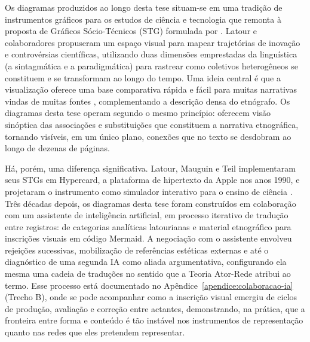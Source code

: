 Os diagramas produzidos ao longo desta tese situam-se em uma tradição de instrumentos gráficos para os estudos de ciência e tecnologia que remonta à proposta de Gráficos Sócio-Técnicos (STG) formulada por \textcite{Latour1992Note}. Latour e colaboradores propuseram um espaço visual para mapear trajetórias de inovação e controvérsias científicas, utilizando duas dimensões emprestadas da linguística (a sintagmática e a paradigmática) para rastrear como coletivos heterogêneos se constituem e se transformam ao longo do tempo. Uma ideia central é que a visualização oferece uma base comparativa rápida e fácil para muitas narrativas vindas de muitas fontes \parencite[p.~37]{LatourMauguinTeil1992}, complementando a descrição densa do etnógrafo. Os diagramas desta tese operam segundo o mesmo princípio: oferecem visão sinóptica das associações e substituições que constituem a narrativa etnográfica, tornando visíveis, em um único plano, conexões que no texto se desdobram ao longo de dezenas de páginas.

Há, porém, uma diferença significativa. Latour, Mauguin e Teil implementaram seus STGs em Hypercard, a plataforma de hipertexto da Apple nos anos 1990, e projetaram o instrumento como simulador interativo para o ensino de ciência \parencite[p.~51]{LatourMauguinTeil1992}. Três décadas depois, os diagramas desta tese foram construídos em colaboração com um assistente de inteligência artificial, em processo iterativo de tradução entre registros: de categorias analíticas latourianas e material etnográfico para inscrições visuais em código Mermaid. A negociação com o assistente envolveu rejeições sucessivas, mobilização de referências estéticas externas e até o diagnóstico de uma segunda IA como aliada argumentativa, configurando ela mesma uma cadeia de traduções no sentido que a Teoria Ator-Rede atribui ao termo. Esse processo está documentado no Apêndice~\ref{apendice:colaboracao-ia} (Trecho B), onde se pode acompanhar como a inscrição visual emergiu de ciclos de produção, avaliação e correção entre actantes, demonstrando, na prática, que a fronteira entre forma e conteúdo é tão instável nos instrumentos de representação quanto nas redes que eles pretendem representar.

